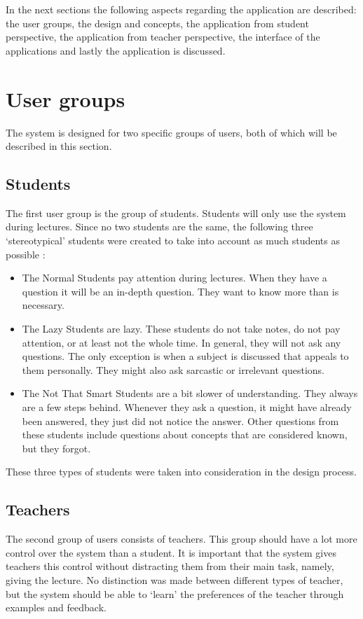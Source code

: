 \documentclass[11pt]{article}
\begin{document}
In the next sections the following aspects regarding the application are described: the user groups, the design and concepts, the application from student perspective, the application from teacher perspective, the interface of the applications and lastly the application is discussed. 

\section{User groups}
The system is designed for two specific groups of users, both of which will be described in this section.
\subsection{Students}
The first user group is the group of students. Students will only use the system during lectures. 
Since no two students are the same, the following three `stereotypical' students were created to take into account as much students as possible :
\begin{itemize}
\item The Normal Students pay attention during lectures. When they have a question it will be an in-depth question. They want to know more than is necessary.
\item The Lazy Students are lazy. These students do not take notes, do not pay attention, or at least not the whole time. In general, they will not ask any questions. The only exception is when a subject is discussed that appeals to them personally. They might also ask sarcastic or irrelevant questions.
\item The Not That Smart Students are a bit slower of understanding. They always are a few steps behind. Whenever they ask a question, it might have already been answered, they just did not notice the answer. Other questions from these students include questions about concepts that are considered known, but they forgot.
\end{itemize}

These three types of students were taken into consideration in the design process.

\subsection{Teachers}
The second group of users consists of teachers. This group should have a lot more control over the system than a student. It is important that the system gives teachers this control without distracting them from their main task, namely, giving the lecture. No distinction was made between different types of teacher, but the system should be able to `learn' the preferences of the teacher through examples and feedback.  
\end{document}
